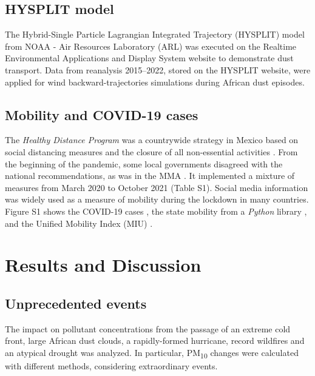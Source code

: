 \documentclass[sn-mathphys-num,iicol]{sn-jnl}
\begin{document}
\subsection{HYSPLIT model}
The Hybrid-Single Particle Lagrangian Integrated Trajectory (HYSPLIT) model from NOAA - Air Resources Laboratory (ARL) \citep{Stein_2015} was executed on the Realtime Environmental Applications and Display System website to demonstrate dust transport. Data from reanalysis 2015–2022, stored on the HYSPLIT website, were applied for wind backward-trajectories simulations during African dust episodes.
\subsection{Mobility and COVID-19 cases}
The \emph{Healthy Distance Program} was a countrywide strategy in Mexico based on social distancing measures and the closure of all non-essential activities \citep{covid-19a}. From the beginning of the pandemic, some local governments disagreed with the national recommendations, as was in the MMA \citep{state}. It implemented a mixture of measures from March 2020 to October 2021 (Table S1). Social media information was widely used as a measure of mobility during the lockdown in many countries. Figure S1 shows the COVID-19 cases \citep{covid19mex}, the state mobility from a \emph{Python} library \citep{Graff_2022}, and the Unified Mobility Index (MIU) \citep{conacyt}.
\section{Results and Discussion}
\subsection{Unprecedented events}
The impact on pollutant concentrations from the passage of an extreme cold front, large African dust clouds, a rapidly-formed hurricane, record wildfires and an atypical drought was analyzed. In particular, PM\textsubscript{10} changes were calculated with different methods, considering extraordinary events.
\end{document}

